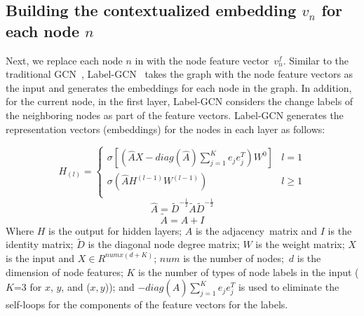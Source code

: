 \subsection{Building the contextualized embedding $v_n$ for each node $n$}
\label{label-gcn-compute}

Next, we replace each node $n$ in {\mvpdgxy} with the node feature
vector~$v^{f}_n$.
Similar to the traditional GCN~\cite{gcn}, Label-GCN~\cite{label-gcn}
takes the graph with the node feature vectors as the input and
generates the embeddings for each node in the graph. In addition, for
the current node, in the first layer, Label-GCN considers the change
labels of the neighboring nodes as part of the feature vectors.
Label-GCN generates the representation vectors (embeddings) for the nodes in each
layer as follows:

\begin{equation}\label{eq1}
	H_{(l)} = 
	\begin{cases}
		\sigma [(\hat{A}X-diag(\hat{A})\sum_{j=1}^{K}e_je^T_j)W^0] &  l = 1\\
		\sigma (\hat{A}H^{(l-1)}W^{(l-1)}) &  l \geq 1\\
	\end{cases}
\end{equation}
\begin{equation}\label{eq2}
	\hat{A} = \tilde{D}^{-\frac{1}{2}}\tilde{A}\tilde{D}^{-\frac{1}{2}}
\end{equation}
\begin{equation}\label{eq3}
	\tilde{A} = A + I
\end{equation}
Where $H$ is the output for hidden layers; $A$ is the
adjacency~matrix and $I$ is the identity matrix; $\tilde{D}$ is the diagonal node degree matrix; $W$
is the weight matrix; $X$ is the input and $X \in R^{numx(d+K)}$;
$num$ is the number of nodes;~$d$ is the dimension of node features;
$K$ is the number of types of node labels in the input ($K$=3 for $x$,
$y$, and ($x,y$)); and $-diag(\hat{A})\sum_{j=1}^{K}e_je^T_j$ is used
to eliminate the self-loops for the components of the feature vectors
for the labels.



